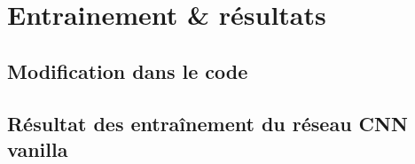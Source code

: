 \section{Entrainement & résultats}

\subsection{Modification dans le code}

\subsection{Résultat des entraînement du réseau CNN vanilla}

